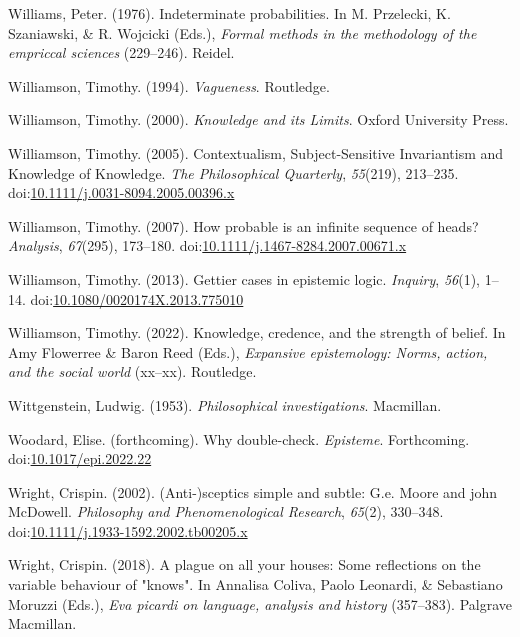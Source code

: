 \documentclass[
  10pt,
  letterpaper,
  twoside]{scrbook}
\newlength{\cslhangindent}
\newenvironment{CSLReferences}[2] %
 {\begin{list}{}{%
  \setlength{\itemindent}{0pt}
  \setlength{\leftmargin}{0pt}
  \setlength{\parsep}{0pt}
  \ifodd #1
   \setlength{\leftmargin}{\cslhangindent}
   \setlength{\itemindent}{-1\cslhangindent}
  \fi
  \setlength{\itemsep}{#2\baselineskip}}}
 {\end{list}}
\begin{document}
\begin{CSLReferences}{1}{0}
Williams, Peter. (1976). Indeterminate probabilities. In M. Przelecki,
K. Szaniawski, \& R. Wojcicki (Eds.), \emph{Formal methods in the
methodology of the empriccal sciences} (229--246). Reidel.

Williamson, Timothy. (1994). \emph{{Vagueness}}. Routledge.

Williamson, Timothy. (2000). \emph{{Knowledge and its Limits}}. Oxford
University Press.

Williamson, Timothy. (2005). {Contextualism, Subject-Sensitive
Invariantism and Knowledge of Knowledge}. \emph{The Philosophical
Quarterly}, \emph{55}(219), 213--235.
doi:\href{https://doi.org/10.1111/j.0031-8094.2005.00396.x}{10.1111/j.0031-8094.2005.00396.x}

Williamson, Timothy. (2007). How probable is an infinite sequence of
heads? \emph{Analysis}, \emph{67}(295), 173--180.
doi:\href{https://doi.org/10.1111/j.1467-8284.2007.00671.x}{10.1111/j.1467-8284.2007.00671.x}

Williamson, Timothy. (2013). Gettier cases in epistemic logic.
\emph{Inquiry}, \emph{56}(1), 1--14.
doi:\href{https://doi.org/10.1080/0020174X.2013.775010}{10.1080/0020174X.2013.775010}

Williamson, Timothy. (2022). Knowledge, credence, and the strength of
belief. In Amy Flowerree \& Baron Reed (Eds.), \emph{Expansive
epistemology: Norms, action, and the social world} (xx--xx). Routledge.

Wittgenstein, Ludwig. (1953). \emph{Philosophical investigations}.
Macmillan.

Woodard, Elise. (forthcoming). Why double-check. \emph{Episteme}.
Forthcoming.
doi:\href{https://doi.org/10.1017/epi.2022.22}{10.1017/epi.2022.22}

Wright, Crispin. (2002). (Anti-)sceptics simple and subtle: G.e. Moore
and john McDowell. \emph{Philosophy and Phenomenological Research},
\emph{65}(2), 330--348.
doi:\href{https://doi.org/10.1111/j.1933-1592.2002.tb00205.x}{10.1111/j.1933-1592.2002.tb00205.x}

Wright, Crispin. (2018). A plague on all your houses: Some reflections
on the variable behaviour of "knows". In Annalisa Coliva, Paolo
Leonardi, \& Sebastiano Moruzzi (Eds.), \emph{Eva picardi on language,
analysis and history} (357--383). Palgrave Macmillan.


\end{CSLReferences}
\end{document}
